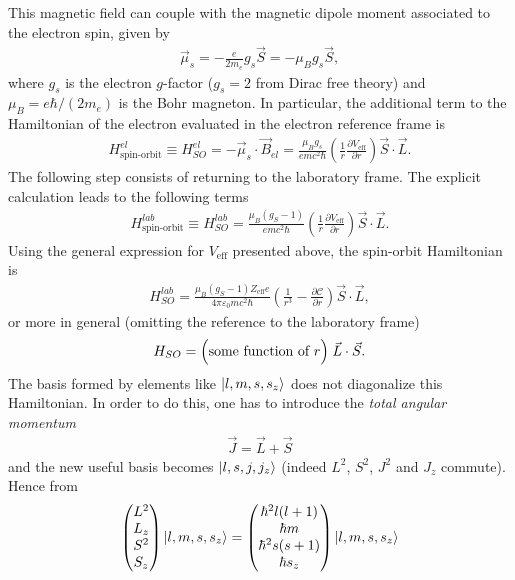 This magnetic field can couple with the magnetic dipole moment associated to the electron spin, given by 
\begin{align*}
    \vec{\mu}_s = -\frac{e}{2 m_e} g_s \vec{S} = -\mu_B g_s \vec{S},  
\end{align*}
where $g_s$ is the electron $g$-factor ($g_s = 2$ from Dirac free theory) and $\mu_B = e\hbar/(2 m_e)$ is the Bohr magneton. In particular, the additional term to the Hamiltonian of the electron evaluated in the electron reference frame is 
\begin{align}
    H_\text{spin-orbit}^{el} \equiv H_{SO}^{el} = - \vec{\mu}_s \cdot \vec{B}_{el} = \frac{\mu_B g_s}{e m c^2 \hbar} \left( \frac{1}{r} \frac{\partial V_\text{eff}}{\partial r} \right)\vec{S} \cdot \vec{L}. 
\end{align}
The following step consists of returning to the laboratory frame. The explicit calculation leads to the following terms 
\begin{align}
    H_\text{spin-orbit}^{lab} \equiv H_{SO}^{lab} = \frac{\mu_B (g_S-1)}{e m c^2 \hbar} \left( \frac{1}{r} \frac{\partial V_\text{eff}}{\partial r} \right)\vec{S} \cdot \vec{L}. 
\end{align}
Using the general expression for $V_\text{eff}$ presented above, the spin-orbit Hamiltonian is 
\begin{align}
    H_{SO}^{lab} = \frac{\mu_B (g_S-1)Z_\text{eff} e}{4 \pi \varepsilon_0 m c^2 \hbar} \left( \frac{1}{r^3} - \frac{\partial \mathcal{C}}{\partial r} \right) \vec{S} \cdot \vec{L}, 
\end{align}
or more in general (omitting the reference to the laboratory frame)
$$H_{SO} = \Bigl( \textrm{some function of } r\Bigr) \; \vec{L}\cdot\vec{S}.$$
The basis formed by elements like $\ket{l,m,s,s_z}$ does not diagonalize this Hamiltonian. In order to do this, one has to introduce the \textit{total angular momentum}
\begin{align}
    \vec{J} = \vec{L} + \vec{S} 
\end{align}
and the new useful basis becomes $\ket{l,s,j,j_z}$ (indeed $L^2$, $S^2$, $J^2$ and $J_z$ commute). Hence from 
\begin{align*}
    \begin{pmatrix}
    L^2 \\ L_z \\ S^2 \\ S_z 
    \end{pmatrix}
    \ket{l,m,s,s_z} = 
    \begin{pmatrix}
    \hbar^2 l(l+1) \\ \hbar m \\ \hbar^2 s(s+1) \\ \hbar s_z 
    \end{pmatrix}
    \ket{l,m,s,s_z} 
\end{align*}
